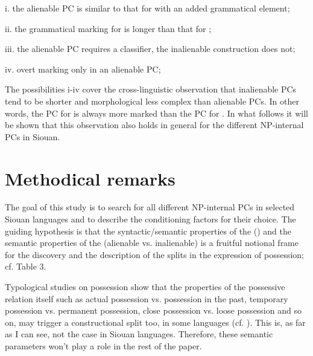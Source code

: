 \documentclass[output=paper]{LSP/langsci}
\begin{document}
\vspace{1em}
i.	the alienable PC is similar to that for  with an added grammatical element;

ii.	the grammatical marking for  is longer than that for ;

iii.	the alienable PC requires a classifier, the inalienable construction does not;

iv.	overt marking only in an alienable PC;
\vspace{1em}

The possibilities i-iv cover the cross-linguistic observation that inalienable PCs tend to be shorter and morphological less complex than alienable PCs. In other words, the PC for  is always more marked than the PC for . In what follows it will be shown that this observation also holds in general for the different NP-internal PCs in Siouan.

\section{Methodical remarks}

The goal of this study is to search for all different NP-internal PCs in selected Siouan languages and to describe the conditioning factors for their choice. The guiding hypothesis is that the syntactic/semantic properties of the  () and the semantic properties of the  (alienable vs. inalienable) is a fruitful notional frame for the discovery and the description of the splits in the expression of possession; cf. Table 3. 
	
Typological studies on possession show that the properties of the possessive relation itself such as actual possession vs. possession in the past, temporary possession vs. permanent possession, close possession vs. loose possession and so on, may trigger a constructional split too, in some languages (cf. \citealt[274--276]{Dixon2010}). This is, as far as I can see, not the case in Siouan languages. Therefore, these semantic parameters won't play a role in the rest of the paper. 
\end{document}
